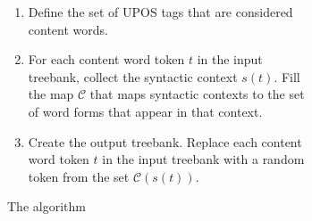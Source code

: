 \begin{figure}[ht]
    \centering
    \begin{subfigure}[]{\textwidth}
        \begin{enumerate}
            \item Define the set of UPOS tags that are considered content words. 
            \item For each content word token $t$ in the input treebank, collect the syntactic context $s(t)$. Fill the map $\mathcal{C}$ that maps syntactic contexts to the set of word forms that appear in that context.
            \item Create the output treebank. Replace each content word token $t$ in the input treebank with a random token from the set $\mathcal{C}(s(t))$.
        \end{enumerate}
        \caption{The algorithm}
    \end{subfigure}
    \begin{subfigure}[]{\textwidth}\centering{}
\end{subfigure}
\end{figure}
